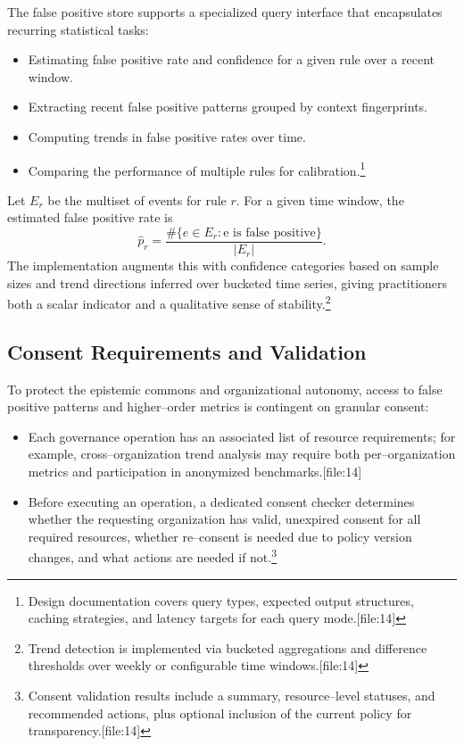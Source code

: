 \documentclass[11pt]{article}
\begin{document}
The false positive store supports a specialized query interface that encapsulates recurring statistical tasks:
\begin{itemize}[leftmargin=*]
  \item Estimating false positive rate and confidence for a given rule over a recent window.
  \item Extracting recent false positive patterns grouped by context fingerprints.
  \item Computing trends in false positive rates over time.
  \item Comparing the performance of multiple rules for calibration.\footnote{Design documentation covers query types, expected output structures, caching strategies, and latency targets for each query mode.[file:14]} 
\end{itemize}

Let \(E_r\) be the multiset of events for rule \(r\). For a given time window, the estimated false positive rate is
\[
  \hat{p}_r = \frac{\#\{e \in E_r : \text{e is false positive}\}}{|E_r|}.
\]
The implementation augments this with confidence categories based on sample sizes and trend directions inferred over bucketed time series, giving practitioners both a scalar indicator and a qualitative sense of stability.\footnote{Trend detection is implemented via bucketed aggregations and difference thresholds over weekly or configurable time windows.[file:14]} 

\subsection{Consent Requirements and Validation}

To protect the epistemic commons and organizational autonomy, access to false positive patterns and higher--order metrics is contingent on granular consent:
\begin{itemize}[leftmargin=*]
  \item Each governance operation has an associated list of resource requirements; for example, cross--organization trend analysis may require both per--organization metrics and participation in anonymized benchmarks.[file:14]
  \item Before executing an operation, a dedicated consent checker determines whether the requesting organization has valid, unexpired consent for all required resources, whether re--consent is needed due to policy version changes, and what actions are needed if not.\footnote{Consent validation results include a summary, resource--level statuses, and recommended actions, plus optional inclusion of the current policy for transparency.[file:14]} 
\end{itemize}
\end{document}
